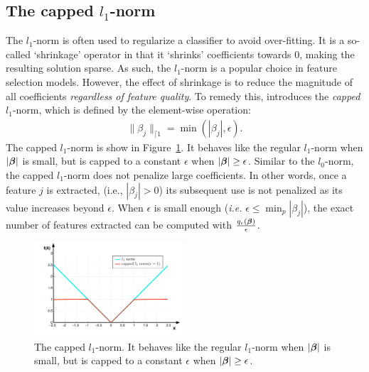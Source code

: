 \subsection{The capped $l_1$-norm}
The $l_1$-norm is often used to regularize a classifier to avoid over-fitting. It is a so-called `shrinkage' operator \citep{tibshirani1996regression} in that it `shrinks' coefficients towards $0$, making the resulting solution sparse. As such, the $l_1$-norm is a popular choice in feature selection models. However, the effect of shrinkage is to reduce the magnitude of all coefficients \emph{regardless of feature quality}. To remedy this, 
\citet{zhang2009multi} introduces the \emph{capped} $l_1$-norm, which is defined by the element-wise operation:
\begin{align}
	\|\beta_j\|_{\lceil 1} = \min(|\beta_j|,\epsilon). \label{eq:cappedl1}
\end{align}
The capped $l_1$-norm is show in Figure~\ref{fig:cappedl1}. It behaves like the regular $l_1$-norm when $|\boldsymbol{\beta}|$ is small, but is capped to a constant $\epsilon$ when $|\boldsymbol{\beta}| \ge \epsilon$. Similar to the $l_0$-norm, the capped $l_1$-norm does not penalize large coefficients. In other words, once a feature $j$ is extracted, (i.e., $|\beta_j| > 0$) its subsequent use is not penalized as its value increases beyond $\epsilon$. When $\epsilon$ is small enough (\emph{i.e. }$\epsilon \le \min_p|\beta_j|$), the exact number of features extracted can be computed with $\frac{q_\epsilon(\boldsymbol{\beta})}{\epsilon}$. 
\begin{figure}[t!!!]
\centerline{
\includegraphics[width = 0.5\textwidth]{plots/cappedl1.pdf}%
}
\caption{The capped $l_1$-norm. It behaves like the regular $l_1$-norm when $|\boldsymbol{\beta}|$ is small, but is capped to a constant $\epsilon$ when $|\boldsymbol{\beta}| \ge \epsilon$.}
\label{fig:cappedl1}
\end{figure}

